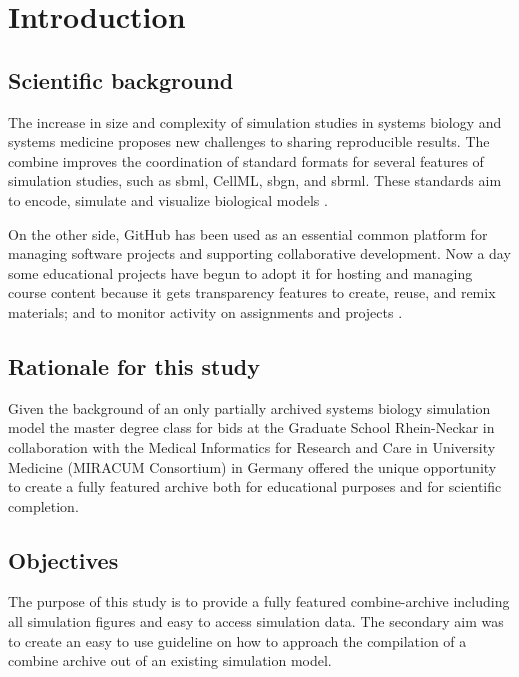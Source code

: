 \section*{Introduction}


\subsection*{Scientific background}
The increase in size and complexity of simulation studies in systems biology and systems medicine proposes new challenges to sharing reproducible results. The \ac{combine} improves the coordination of standard formats for several features of simulation studies, such as \ac{sbml}, CellML, \ac{sbgn}, and \ac{sbrml}. These standards aim to encode, simulate and visualize biological models \cite{combine}.

On the other side, GitHub has been used as an essential common platform for managing software projects and supporting collaborative development. Now a day some educational projects have begun to adopt it for hosting and managing course content because it gets transparency features to create, reuse, and remix materials; and to monitor activity on assignments and projects \cite{github}.


\subsection*{Rationale for this study}
Given the background of an only partially archived  systems biology simulation model the master degree class for \ac{bids} at the Graduate School Rhein-Neckar  in  collaboration  with  the  Medical  Informatics  for  Research  and  Care  in  University Medicine (MIRACUM Consortium) in Germany offered the unique opportunity to create a fully featured archive both for educational purposes and for scientific completion.

\subsection*{Objectives}
The purpose of this study is to provide a fully featured \acs{combine}-archive including all simulation figures and easy to access simulation data. The secondary aim was to create an easy to use guideline on how to approach the compilation of a \acs{combine} archive out of an existing simulation model.

